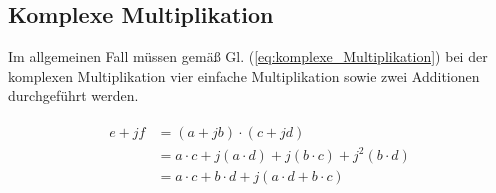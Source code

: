 \subsection{Komplexe Multiplikation}\label{sec:komplexe_Multiplikation}

Im allgemeinen Fall müssen gemäß Gl. (\ref{eq:komplexe_Multiplikation}) bei der komplexen Multiplikation vier einfache Multiplikation sowie zwei Additionen durchgeführt werden.


\begin{align}\label{eq:komplexe_Multiplikation}
\begin{split}
 e + jf &= (a + jb) \cdot (c + jd)\\
        &= a \cdot c + j(a \cdot d) + j(b \cdot c) + j^2(b \cdot d)\\
        &= a \cdot c + b \cdot d + j(a \cdot d + b \cdot c)
\end{split}
\end{align}


